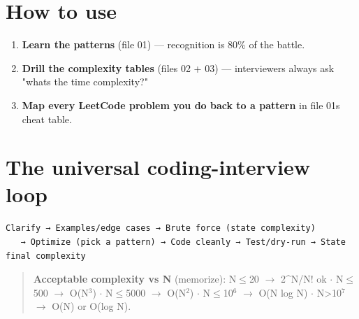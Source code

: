 \documentclass[11pt]{article}
\providecommand{\tightlist}{\setlength{\itemsep}{1pt}\setlength{\parskip}{0pt}}
\begin{document}
\section{How to use}\label{how-to-use}

\begin{enumerate}
\def\labelenumi{\arabic{enumi}.}
\tightlist
\item
  \textbf{Learn the patterns} (file 01) --- recognition is 80\% of the battle.
\item
  \textbf{Drill the complexity tables} (files 02 + 03) --- interviewers always ask "what\textquotesingle s the time complexity?"
\item
  \textbf{Map every LeetCode problem you do back to a pattern} in file 01\textquotesingle s cheat table.
\end{enumerate}

\section{The universal coding-interview loop}\label{the-universal-coding-interview-loop}

\setcodelang{}

\begin{verbatim}
Clarify → Examples/edge cases → Brute force (state complexity)
   → Optimize (pick a pattern) → Code cleanly → Test/dry-run → State final complexity
\end{verbatim}

\begin{quote}
\textbf{Acceptable complexity vs N} (memorize): N\(\leq\)20 \(\rightarrow\) 2\^{}N/N! ok \(\cdot\) N\(\leq\)500 \(\rightarrow\) O(N\(^3\)) \(\cdot\) N\(\leq\)5000 \(\rightarrow\) O(N\(^2\)) \(\cdot\) N\(\leq\)10\(^6\) \(\rightarrow\) O(N log N) \(\cdot\) N\textgreater10\(^7\) \(\rightarrow\) O(N) or O(log N).
\end{quote}
\end{document}
